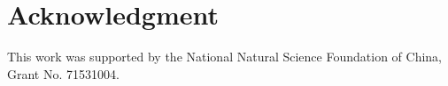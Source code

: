 \documentclass[journal]{IEEEtran}
\begin{document}






%


\appendices

\section*{Acknowledgment}
This work was supported by the National Natural Science Foundation of China, Grant No. 71531004.


\ifCLASSOPTIONcaptionsoff
  \newpage
\fi
\end{document}
